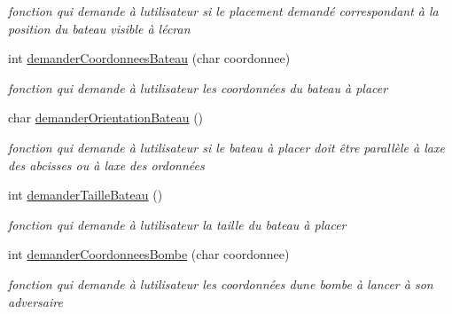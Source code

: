 \begin{DoxyCompactItemize}
\begin{DoxyCompactList}\small\item\em fonction qui demande à l\textquotesingle{}utilisateur si le placement demandé correspondant à la position du bateau visible à l\textquotesingle{}écran \end{DoxyCompactList}\item 
int \hyperlink{class_affichage_afcbb7a5076346a17d32f6ad464951748}{demander\+Coordonnees\+Bateau} (char coordonnee)
\begin{DoxyCompactList}\small\item\em fonction qui demande à l\textquotesingle{}utilisateur les coordonnées du bateau à placer \end{DoxyCompactList}\item 
char \hyperlink{class_affichage_a3e47a8396a57fe873cd55bdf22ab2fa4}{demander\+Orientation\+Bateau} ()
\begin{DoxyCompactList}\small\item\em fonction qui demande à l\textquotesingle{}utilisateur si le bateau à placer doit être parallèle à l\textquotesingle{}axe des abcisses ou à l\textquotesingle{}axe des ordonnées \end{DoxyCompactList}\item 
int \hyperlink{class_affichage_a5e0b0269a5b41b1c0fcdf6c3ddeee1e7}{demander\+Taille\+Bateau} ()
\begin{DoxyCompactList}\small\item\em fonction qui demande à l\textquotesingle{}utilisateur la taille du bateau à placer \end{DoxyCompactList}\item 
int \hyperlink{class_affichage_a5a087aa11bde8b505d992fc38ae21997}{demander\+Coordonnees\+Bombe} (char coordonnee)
\begin{DoxyCompactList}\small\item\em fonction qui demande à l\textquotesingle{}utilisateur les coordonnées d\textquotesingle{}une bombe à lancer à son adversaire \end{DoxyCompactList}\end{DoxyCompactItemize}
